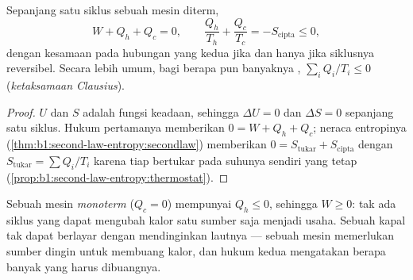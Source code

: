 \begin{theorem}\label{thm:b1:heat-engines:clausius}
Sepanjang satu siklus sebuah mesin diterm,
\[
W + Q_h + Q_c = 0 , \qquad
\frac{Q_h}{T_h} + \frac{Q_c}{T_c} = -S_{\mathrm{cipta}} \leq 0 ,
\]
dengan kesamaan pada hubungan yang kedua jika dan hanya jika siklusnya
reversibel. Secara lebih umum, bagi berapa pun banyaknya ,
$\sum_i Q_i/T_i \leq 0$ (\emph{ketaksamaan Clausius}).
\end{theorem}

\begin{proof}
$U$ dan $S$ adalah fungsi keadaan, sehingga $\Delta U = 0$ dan $\Delta S = 0$ sepanjang
satu siklus. Hukum pertamanya memberikan $0 = W + Q_h + Q_c$; neraca entropinya
(\cref{thm:b1:second-law-entropy:secondlaw}) memberikan $0 = S_{\mathrm{tukar}} +
S_{\mathrm{cipta}}$ dengan $S_{\mathrm{tukar}} = \sum Q_i/T_i$ karena tiap
 bertukar pada suhunya sendiri yang tetap
(\cref{prop:b1:second-law-entropy:thermostat}).
\end{proof}

\begin{corollary}\label{cor:b1:heat-engines:kelvin}
Sebuah mesin \emph{monoterm} ($Q_c = 0$) mempunyai $Q_h \leq 0$, sehingga $W \geq 0$:
tak ada siklus yang dapat mengubah kalor satu sumber saja menjadi usaha. Sebuah kapal
tak dapat berlayar dengan mendinginkan lautnya --- sebuah mesin memerlukan sumber dingin
untuk membuang kalor, dan hukum kedua mengatakan berapa banyak yang harus dibuangnya.
\end{corollary}

